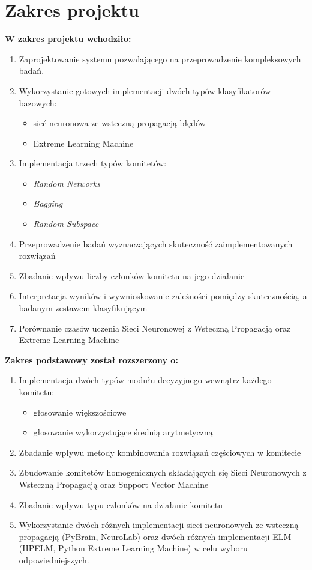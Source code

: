 \documentclass[11pt, a4paper, titlepage]{report}
\begin{document}
\section{Zakres projektu}
\textbf{W zakres projektu wchodziło: }
\begin{enumerate}


\item Zaprojektowanie systemu pozwalającego na przeprowadzenie kompleksowych badań.
\item Wykorzystanie gotowych implementacji dwóch typów klasyfikatorów bazowych:
\begin{itemize}
\item sieć neuronowa ze wsteczną propagacją błędów
\item Extreme Learning Machine
\end{itemize}
\item Implementacja trzech typów komitetów:
\begin{itemize}
\item \textit{Random Networks}
\item \textit{Bagging}
\item \textit{Random Subspace}
\end{itemize}
\item Przeprowadzenie badań wyznaczających skuteczność zaimplementowanych rozwiązań
\item Zbadanie wpływu liczby członków komitetu na jego działanie
\item Interpretacja wyników i wywnioskowanie zależności pomiędzy skutecznością, a badanym zestawem klasyfikującym
\item Porównanie czasów uczenia Sieci Neuronowej z Wsteczną Propagacją oraz Extreme Learning Machine
\end{enumerate}

\textbf{Zakres podstawowy został rozszerzony o:}
\begin{enumerate}
\item Implementacja dwóch typów modułu decyzyjnego wewnątrz każdego komitetu:
\begin{itemize}
\item głosowanie większościowe
\item głosowanie wykorzystujące średnią arytmetyczną
\end{itemize}
\item Zbadanie wpływu metody kombinowania rozwiązań częściowych w komitecie
\item Zbudowanie komitetów homogenicznych składających się Sieci Neuronowych z Wsteczną Propagacją oraz Support Vector Machine
\item Zbadanie wpływu typu członków na działanie komitetu
\item Wykorzystanie dwóch różnych implementacji sieci neuronowych ze wsteczną propagacją (PyBrain, NeuroLab) oraz dwóch różnych implementacji ELM (HPELM, Python Extreme Learning Machine) w celu wyboru odpowiedniejszych.
\end{enumerate}
\end{document}
